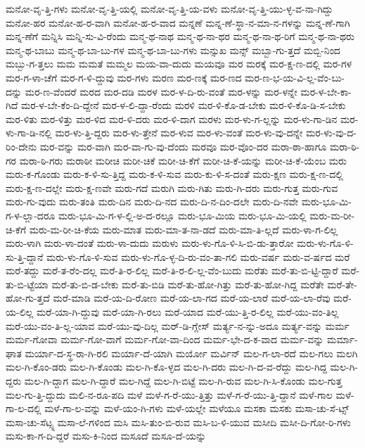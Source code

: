 {ಮನೋ-ವೃ-ತ್ತಿ-ಗಳು
ಮನೋ-ವೃ-ತ್ತಿ-ಯಲ್ಲಿ
ಮನೋ-ವೃ-ತ್ತಿ-ಯ-ವಳು
ಮನೋ-ವೃ-ತ್ತಿ-ಯು-ಳ್ಳ-ವ-ನಾ-ಗಿದ್ದು
ಮನೋ-ಹರ
ಮನೋ-ಹ-ರ-ವಾಗಿ
ಮನೋ-ಹ-ರ-ವಾದ
ಮನ್ನಣೆ
ಮನ್ನ-ಣೆ-ಸ್ಥಾ-ನ-ಮಾ-ನ-ಗಳನ್ನು
ಮನ್ನ-ಣೆ-ಗಾಗಿ
ಮನ್ನ-ಣೆಗೆ
ಮನ್ನಿಸಿ
ಮನ್ನಿ-ಸು-ವಿ-ರೆಂದು
ಮನ್ಮ-ಥ-ನಾಥ
ಮನ್ಮ-ಥ-ನಾ-ಥರ
ಮನ್ಮ-ಥ-ನಾ-ಥ-ರಿಗೆ
ಮನ್ಮ-ಥ-ನಾ-ಥರು
ಮನ್ಮ-ಥ-ಬಾಬು
ಮನ್ಮ-ಥ-ಬಾ-ಬು-ಗಳ
ಮನ್ಮ-ಥ-ಬಾ-ಬು-ಗಳು
ಮನ್ಸುಖ
ಮನ್ಸ್
ಮಬ್ಬಾ-ಗು-ತ್ತದೆ
ಮಬ್ಬಿ-ನಿಂದ
ಮಬ್ಬು-ಗ-ತ್ತಲು
ಮಮ
ಮಮತೆ
ಮಮ್ಮಲ
ಮಯ-ವಾ-ದುದು
ಮಯವೂ
ಮರ
ಮರಕ್ಕೆ
ಮರ-ಕ್ಷ-ಣ-ದಲ್ಲಿ
ಮರ-ಗಳ
ಮರ-ಗ-ಳಾ-ಚೆಗೆ
ಮರ-ಗ-ಳಿ-ದ್ದುವು
ಮರ-ಗಳು
ಮರಣ
ಮರ-ಣಕ್ಕೆ
ಮರ-ಣದ
ಮರ-ಣ-ಭ-ಯ-ವಿ-ಲ್ಲ-ವೆಂ-ಬು-ದನ್ನು
ಮರ-ಣ-ವೆಂದರೆ
ಮರದ
ಮರ-ದಡಿ
ಮರಳ
ಮರ-ಳ-ದಿ-ರು-ವಂತೆ
ಮರ-ಳನ್ನು
ಮರ-ಳನ್ನೇ
ಮರ-ಳ-ಬೇ-ಕಾ-ಗಿದೆ
ಮರ-ಳ-ಬೇ-ಕೆಂ-ದಿ-ದ್ದೇನೆ
ಮರ-ಳ-ಲಿ-ದ್ದಾ-ರೆಂದು
ಮರಳಿ
ಮರ-ಳಿ-ಕೊ-ಡ-ಬೇಕು
ಮರ-ಳಿ-ಕೊ-ಡಿ-ಸ-ಬೇಕು
ಮರ-ಳಿತು
ಮರ-ಳಿತ್ತು
ಮರ-ಳಿದ
ಮರ-ಳಿ-ದರು
ಮರ-ಳಿ-ದಾಗ
ಮರಳು
ಮರ-ಳು-ಗ-ಲ್ಲನ್ನು
ಮರ-ಳು-ಗಾ-ಡಿನ
ಮರ-ಳು-ಗಾ-ಡಿ-ನಲ್ಲಿ
ಮರ-ಳು-ತ್ತಿ-ದ್ದರು
ಮರ-ಳು-ತ್ತೇನೆ
ಮರ-ಳುವ
ಮರ-ಳು-ವಂತೆ
ಮರ-ಳು-ವು-ದನ್ನೇ
ಮರ-ಳು-ವು-ದ-ರಿಂ-ದೇನು
ಮರ-ವನ್ನು
ಮರ-ವಾಗಿ
ಮರ-ವಾ-ಗು-ವು-ದೆಂದು
ಮರವೂ
ಮರ-ವೊಂ-ದರ
ಮರಾ-ಠಾ-ಹಾಗೂ
ಮರಾ-ಠಿ-ಗರ
ಮರಾ-ಠಿ-ಗರು
ಮರಾಠೀ
ಮರೀಚಿ
ಮರೀ-ಚಿಕೆ
ಮರೀ-ಚಿ-ಕೆಗೆ
ಮರೀ-ಚಿ-ಕೆ-ಯನ್ನು
ಮರೀ-ಚಿ-ಕೆ-ಯೆಂಬ
ಮರು
ಮರು-ಕ-ಗೊಂಡು
ಮರು-ಕ-ಳಿ-ಸು-ತ್ತಿದ್ದ
ಮರು-ಕ-ಳಿ-ಸುವ
ಮರು-ಕು-ಳಿ-ಸ-ದಂತೆ
ಮರು-ಕ್ಷಣ
ಮರು-ಕ್ಷ-ಣ-ದಲ್ಲಿ
ಮರು-ಕ್ಷ-ಣ-ದಲ್ಲೇ
ಮರು-ಕ್ಷ-ಣವೇ
ಮರು-ಗದೆ
ಮರುಗಿ
ಮರು-ಗಿತು
ಮರು-ಗಿ-ದರು
ಮರು-ಗುತ್ತ
ಮರು-ಗುವ
ಮರು-ಗು-ವುದು
ಮರು-ತಂತಿ
ಮರು-ದಿನ
ಮರು-ದಿ-ನದ
ಮರು-ದಿ-ನ-ದಿಂ-ದಲೇ
ಮರು-ದಿ-ನವೇ
ಮರು-ಭೂ-ಮಿ-ಗ-ಳ-ಲ್ಲಾ-ದರೂ
ಮರು-ಭೂ-ಮಿ-ಗ-ಳ-ಲ್ಲಿ-ಅ-ದ-ರಲ್ಲೂ
ಮರು-ಭೂ-ಮಿಯ
ಮರು-ಭೂ-ಮಿ-ಯಲ್ಲಿ
ಮರು-ಮ-ರೀ-ಚಿ-ಕೆಗೆ
ಮರು-ಮ-ರೀ-ಚಿ-ಕೆಯ
ಮರು-ಮಾತ
ಮರು-ಮಾ-ತ-ನಾ-ಡದೆ
ಮರು-ಮಾ-ತಿ-ಲ್ಲದೆ
ಮರು-ಳಾ-ಗ-ಲಿಲ್ಲ
ಮರು-ಳಾಗಿ
ಮರು-ಳಾ-ದಂತೆ
ಮರು-ಳಾ-ದುದು
ಮರುಳು
ಮರು-ಳು-ಗೊ-ಳಿ-ಸಿ-ಬಿ-ಡು-ತ್ತಾರೋ
ಮರು-ಳು-ಗೊ-ಳಿ-ಸು-ತ್ತಿ-ದ್ದಾನೆ
ಮರು-ಳು-ಗೊ-ಳಿ-ಸುವ
ಮರು-ಳು-ಗೊ-ಳ್ಳ-ದಿ-ರು-ವಂ-ತಾ-ಗಲಿ
ಮರು-ವರ್ಷ
ಮರು-ವ-ರ್ಷದ
ಮರೆ
ಮರೆ-ತದ್ದು
ಮರೆ-ತ-ರೆಂ-ದಲ್ಲ
ಮರೆ-ತಿ-ರ-ಲಿಲ್ಲ
ಮರೆ-ತಿ-ರ-ಲಿ-ಲ್ಲ-ವೆಂ-ಬುದು
ಮರೆತು
ಮರೆ-ತು-ಬಿ-ಟ್ಟಿ-ದ್ದಾರೆ
ಮರೆ-ತು-ಬಿ-ಟ್ಟೆಯಾ
ಮರೆ-ತು-ಬಿ-ಡ-ಬೇಕು
ಮರೆ-ತು-ಬಿಡಿ
ಮರೆ-ತು-ಹೋ-ಗಿತ್ತು
ಮರೆ-ತು-ಹೋ-ಗಿದ್ದ
ಮರೆತೇ
ಮರೆ-ತೇ-ಹೋ-ಗು-ತ್ತದೆ
ಮರೆ-ಮಾಡಿ
ಮರೆ-ಯ-ದಿ-ರೋಣ
ಮರೆ-ಯ-ಲಾ-ಗದ
ಮರೆ-ಯ-ಲಾರೆ
ಮರೆ-ಯ-ಲಾ-ರೆವು
ಮರೆ-ಯ-ಲಿಲ್ಲ
ಮರೆ-ಯಾ-ಗಿ-ದ್ದುವು
ಮರೆ-ಯಾ-ಗಿ-ರಲು
ಮರೆ-ಯಾದ
ಮರೆ-ಯು-ತ್ತಿ-ರ-ಲಿಲ್ಲ
ಮರೆ-ಯು-ವಂ-ತಿಲ್ಲ
ಮರೆ-ಯು-ವಂ-ತಿ-ಲ್ಲ-ಯಾವ
ಮರೆ-ಯು-ವು-ದಿಲ್ಲ
ಮರ್-ಡಿ-ಗ್ಲೇಸ್
ಮರ್ತ್ಯ-ನ-ನ್ನು-ಅದೂ
ಮರ್ತ್ಯ-ವನ್ನು
ಮರ್ಮ
ಮರ್ಮ-ಗೋವಾ
ಮರ್ಮ-ಗೋ-ವಾಗೆ
ಮರ್ಮ-ಗೋ-ವಾ-ದಿಂದ
ಮರ್ಮ-ಭೇ-ದ-ಕ-ವಾದ
ಮರ್ಮ-ವನ್ನು
ಮರ್ಮಾ-ಘಾತ
ಮರ್ಯಾ-ದ-ಸ್ಥ-ರಾ-ಗಿ-ರಲಿ
ಮರ್ಯಾ-ದೆ-ಯಾಗಿ
ಮರ್ಯೋ
ಮರ್ವಿನ್
ಮಲ-ಗ-ಲಾ-ರದೆ
ಮಲ-ಗಲು
ಮಲಗಿ
ಮಲ-ಗಿ-ಕೊಂ-ಡರು
ಮಲ-ಗಿ-ಕೊಂಡು
ಮಲ-ಗಿ-ಕೊ-ಳ್ಳದ
ಮಲ-ಗಿ-ದರು
ಮಲ-ಗಿ-ದ-ವ-ರೆದ್ದು
ಮಲ-ಗಿದ್ದ
ಮಲ-ಗಿ-ದ್ದರು
ಮಲ-ಗಿ-ದ್ದಾಗ
ಮಲ-ಗಿ-ದ್ದಾರೆ
ಮಲ-ಗಿದ್ದೆ
ಮಲ-ಗಿ-ಬಿಟ್ಟೆ
ಮಲ-ಗಿ-ರುವ
ಮಲ-ಗಿ-ಸಿ-ಕೊಂಡು
ಮಲ-ಗುತ್ತ
ಮಲ-ಗು-ತ್ತಿ-ದ್ದುದು
ಮಲಿ-ನ-ರೂ-ಪದಿ
ಮಳೆ
ಮಳೆ-ಗ-ರೆ-ಯು-ತ್ತಿತ್ತು
ಮಳೆ-ಗ-ರೆ-ಯು-ತ್ತಿ-ದ್ದಾನೆ
ಮಳೆ-ಗಾಲ
ಮಳೆ-ಗಾ-ಲ-ದಲ್ಲಿ
ಮಳೆ-ಗಾ-ಲ-ವನ್ನು
ಮಳೆ-ಯಂ-ಗಿ-ಗಳು
ಮಳೆ-ಯಲ್ಲೇ
ಮಳೆಯೂ
ಮಸಕಾ
ಮಸಕು
ಮಸಾ-ಚು-ಸೆ-ಟ್ಸ್
ಮಸಾ-ಚು-ಸೆಟ್ಸ್ನ
ಮಸಾ-ಲೆ-ಗಳಿಂದ
ಮಸಿ
ಮಸಿ-ತುಂ-ಬಿ-ರುವ
ಮಸಿ-ಬ-ಳಿ-ಯುವ
ಮಸೀದಿ
ಮಸೀ-ದಿ-ಗೋ-ರಿ-ಗಳು
ಮಸು-ಕಾ-ಗ-ದಿ-ದ್ದರೆ
ಮಸು-ಕಿ-ನಿಂದ
ಮಸೂದೆ
ಮಸೂ-ದೆ-ಯನ್ನು
}
